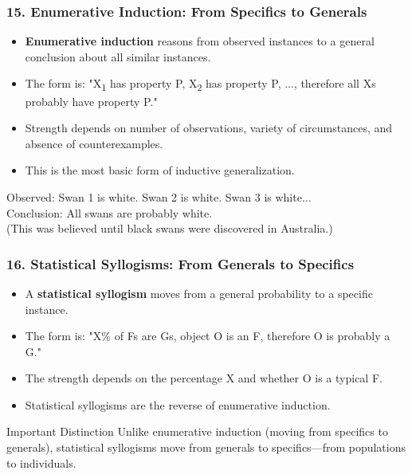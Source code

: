 \documentclass{beamer}
\begin{document}
\begin{frame}
\frametitle{15. Enumerative Induction: From Specifics to Generals}
\begin{itemize}
\item \textbf{Enumerative induction} reasons from observed instances to a general conclusion about all similar instances.
\item The form is: "X\textsubscript{1} has property P, X\textsubscript{2} has property P, ..., therefore all Xs probably have property P."
\item Strength depends on number of observations, variety of circumstances, and absence of counterexamples.
\item This is the most basic form of inductive generalization.
\end{itemize}

\begin{example}
Observed: Swan 1 is white. Swan 2 is white. Swan 3 is white...\\
Conclusion: All swans are probably white.\\
(This was believed until black swans were discovered in Australia.)
\end{example}
\end{frame}


\begin{frame}
\frametitle{16. Statistical Syllogisms: From Generals to Specifics}
\begin{itemize}
\item A \textbf{statistical syllogism} moves from a general probability to a specific instance.
\item The form is: "X\% of Fs are Gs, object O is an F, therefore O is probably a G."
\item The strength depends on the percentage X and whether O is a typical F.
\item Statistical syllogisms are the reverse of enumerative induction.
\end{itemize}

\begin{alertblock}{Important Distinction}
Unlike enumerative induction (moving from specifics to generals), statistical syllogisms move from generals to specifics—from populations to individuals.
\end{alertblock}
\end{frame}
\end{document}
